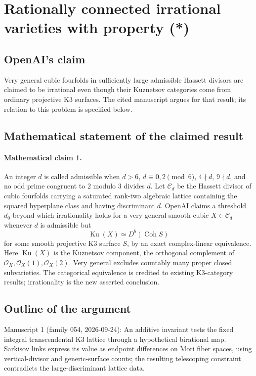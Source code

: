 \documentclass[11pt]{article}
\begin{document}
\section*{Rationally connected irrational varieties with property (*)}

\subsection{OpenAI's claim}
Very general cubic fourfolds in sufficiently large admissible Hassett divisors are claimed to be irrational even though their Kuznetsov categories come from ordinary projective K3 surfaces. The cited manuscript argues for that result; its relation to this problem is specified below.

\subsection{Mathematical statement of the claimed result}
\paragraph{Mathematical claim 1.} An integer $d$ is called admissible when $d>6$, $d\equiv0,2\pmod6$, $4\nmid d$, $9\nmid d$, and no odd prime congruent to $2$ modulo $3$ divides $d$. Let $\mathcal C_d$ be the Hassett divisor of cubic fourfolds carrying a saturated rank-two algebraic lattice containing the squared hyperplane class and having discriminant $d$. OpenAI claims a threshold $d_0$ beyond which irrationality holds for a very general smooth cubic $X\in\mathcal C_d$ whenever $d$ is admissible but
\[
\operatorname{Ku}(X)\simeq D^b(\operatorname{Coh}S)
\]
for some smooth projective K3 surface $S$, by an exact complex-linear equivalence. Here $\operatorname{Ku}(X)$ is the Kuznetsov component, the orthogonal complement of $\mathcal O_X,\mathcal O_X(1),\mathcal O_X(2)$. Very general excludes countably many proper closed subvarieties. The categorical equivalence is credited to existing K3-category results; irrationality is the new asserted conclusion.

\subsection{Outline of the argument}
Manuscript 1 (family 054, 2026-09-24): An additive invariant tests the fixed integral transcendental K3 lattice through a hypothetical birational map. Sarkisov links express its value as endpoint differences on Mori fiber spaces, using vertical-divisor and generic-surface counts; the resulting telescoping constraint contradicts the large-discriminant lattice data.
\end{document}
